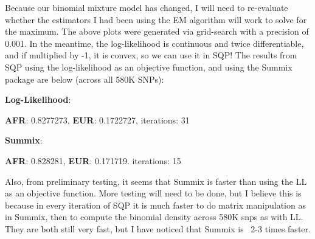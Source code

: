 \documentclass[11pt,a4paper]{article}
\begin{document}
Because our binomial mixture model has changed, I will need to re-evaluate whether the estimators I had been using the EM algorithm will work to solve for the maximum. The above plots were generated via grid-search with a precision of 0.001.  In the meantime, the log-likelihood is continuous and twice differentiable, and if multiplied by -1, it is convex, so we can use it in SQP! The results from SQP using the log-likelihood as an objective function, and using the Summix package are below (across all 580K SNPs):\\
\begin{center}
\textbf{Log-Likelihood}:

\textbf{AFR}: 0.8277273, \textbf{EUR}: 0.1722727, iterations: 31 \\
\hfill

\textbf{Summix}:

\textbf{AFR}: 0.828281, \textbf{EUR}: 0.171719. iterations: 15 \\
\end{center}

Also, from preliminary testing, it seems that Summix is faster than using the LL as an objective function. More testing will need to be done, but I believe this is because in every iteration of SQP it is much faster to do matrix manipulation as in Summix, then to compute the binomial density across 580K snps as with LL. They are both still very fast, but I have noticed that Summix is ~2-3 times faster.
\end{document}
